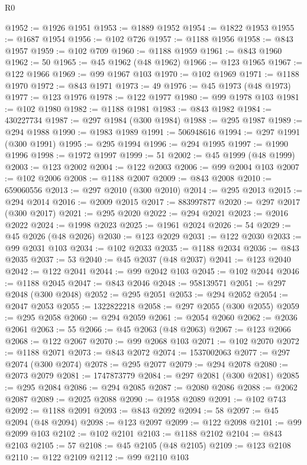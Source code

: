 \begin{lexlean}{R0}
\begin{coremodule}
@1952 := @1926 @1951
@1953 := @1889 @1952
@1954 := @1822 @1953
@1955 := @1687 @1954
@1956 := @102 @726
@1957 := @1188 @1956
@1958 := @843 @1957
@1959 := @102 @709
@1960 := @1188 @1959
@1961 := @843 @1960
@1962 := 50
@1965 := @45 @1962 (@48 @1962)
@1966 := @123 @1965
@1967 := @122 @1966
@1969 := @99 @1967 @103
@1970 := @102 @1969
@1971 := @1188 @1970
@1972 := @843 @1971
@1973 := 49
@1976 := @45 @1973 (@48 @1973)
@1977 := @123 @1976
@1978 := @122 @1977
@1980 := @99 @1978 @103
@1981 := @102 @1980
@1982 := @1188 @1981
@1983 := @843 @1982
@1984 := 430227734
@1987 := @297 @1984 (@300 @1984)
@1988 := @295 @1987
@1989 := @294 @1988
@1990 := @1983 @1989
@1991 := 506948616
@1994 := @297 @1991 (@300 @1991)
@1995 := @295 @1994
@1996 := @294 @1995
@1997 := @1990 @1996
@1998 := @1972 @1997
@1999 := 51
@2002 := @45 @1999 (@48 @1999)
@2003 := @123 @2002
@2004 := @122 @2003
@2006 := @99 @2004 @103
@2007 := @102 @2006
@2008 := @1188 @2007
@2009 := @843 @2008
@2010 := 659060556
@2013 := @297 @2010 (@300 @2010)
@2014 := @295 @2013
@2015 := @294 @2014
@2016 := @2009 @2015
@2017 := 883997877
@2020 := @297 @2017 (@300 @2017)
@2021 := @295 @2020
@2022 := @294 @2021
@2023 := @2016 @2022
@2024 := @1998 @2023
@2025 := @1961 @2024
@2026 := 54
@2029 := @45 @2026 (@48 @2026)
@2030 := @123 @2029
@2031 := @122 @2030
@2033 := @99 @2031 @103
@2034 := @102 @2033
@2035 := @1188 @2034
@2036 := @843 @2035
@2037 := 53
@2040 := @45 @2037 (@48 @2037)
@2041 := @123 @2040
@2042 := @122 @2041
@2044 := @99 @2042 @103
@2045 := @102 @2044
@2046 := @1188 @2045
@2047 := @843 @2046
@2048 := 958139571
@2051 := @297 @2048 (@300 @2048)
@2052 := @295 @2051
@2053 := @294 @2052
@2054 := @2047 @2053
@2055 := 1322822218
@2058 := @297 @2055 (@300 @2055)
@2059 := @295 @2058
@2060 := @294 @2059
@2061 := @2054 @2060
@2062 := @2036 @2061
@2063 := 55
@2066 := @45 @2063 (@48 @2063)
@2067 := @123 @2066
@2068 := @122 @2067
@2070 := @99 @2068 @103
@2071 := @102 @2070
@2072 := @1188 @2071
@2073 := @843 @2072
@2074 := 1537002063
@2077 := @297 @2074 (@300 @2074)
@2078 := @295 @2077
@2079 := @294 @2078
@2080 := @2073 @2079
@2081 := 1747873779
@2084 := @297 @2081 (@300 @2081)
@2085 := @295 @2084
@2086 := @294 @2085
@2087 := @2080 @2086
@2088 := @2062 @2087
@2089 := @2025 @2088
@2090 := @1958 @2089
@2091 := @102 @743
@2092 := @1188 @2091
@2093 := @843 @2092
@2094 := 58
@2097 := @45 @2094 (@48 @2094)
@2098 := @123 @2097
@2099 := @122 @2098
@2101 := @99 @2099 @103
@2102 := @102 @2101
@2103 := @1188 @2102
@2104 := @843 @2103
@2105 := 57
@2108 := @45 @2105 (@48 @2105)
@2109 := @123 @2108
@2110 := @122 @2109
@2112 := @99 @2110 @103

\end{coremodule}
\end{lexlean}
